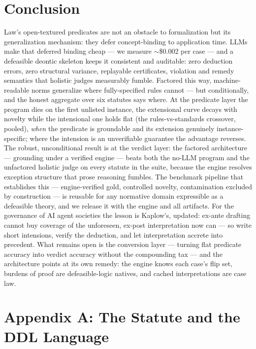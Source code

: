 \section{Conclusion}

Law's open-textured predicates are not an obstacle to formalization but its
generalization mechanism: they defer concept-binding to application time.
LLMs make that deferred binding cheap --- we measure $\sim$\$0.002 per case
--- and a defeasible deontic skeleton keeps it consistent and auditable:
zero deduction errors, zero structural variance, replayable certificates,
violation and remedy semantics that holistic judges measurably fumble.
Factored this way, machine-readable norms generalize where fully-specified
rules cannot --- but conditionally, and the honest aggregate over six statutes
says where. At the predicate layer the program dies on the first unlisted
instance, the extensional curve decays with novelty while the intensional one
holds flat (the rules-vs-standards crossover, pooled), \emph{when} the
predicate is groundable and its extension genuinely instance-specific; where
the intension is an unverifiable guarantee the advantage reverses. The
robust, unconditional result is at the verdict layer: the factored
architecture --- grounding under a verified engine --- beats both the no-LLM
program and the unfactored holistic judge on every statute in the suite,
because the engine resolves exception structure that prose reasoning fumbles.
The benchmark pipeline that establishes this
--- engine-verified gold, controlled novelty, contamination excluded by
construction --- is reusable for any normative domain expressible as a
defeasible theory, and we release it with the engine and all artifacts. For
the governance of AI agent societies the lesson is Kaplow's, updated:
ex-ante drafting cannot buy coverage of the unforeseen, ex-post
interpretation now can --- so write short intensions, verify the deduction,
and let interpretation accrete into precedent. What remains open is the
conversion layer --- turning flat predicate accuracy into verdict accuracy
without the compounding tax --- and the architecture points at its own
remedy: the engine knows each case's flip set, burdens of proof are
defeasible-logic natives, and cached interpretations are case law.



\appendix

\section{Appendix A: The Statute and the DDL Language}

